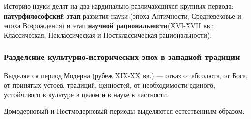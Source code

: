 Историю науки делят на два кардинально различающихся крупных периода: \textbf{натурфилософский этап} развития науки (эпоха Античности, Средневековье и эпоха Возрождения) и этап \textbf{научной рациональности}(XVI-XVII вв.: Классическая, Неклассическая и Постклассическая рациональности).


\subsubsection{Разделение культурно-исторических эпох в западной традиции}

Выделяется период Модерна (рубеж XIX-XX вв.) --- отказ от абсолюта, от
Бога, от принятых устоев, традиций, ценностей, от необходимости единого,
устойчивого в культуре в целом и в науке в
частности.

Домодерновый и Постмодерновый периоды выделяются естественным образом.